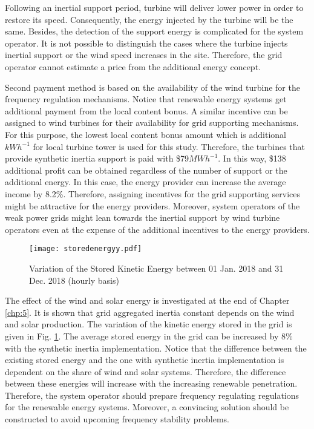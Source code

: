 Following an inertial support period, turbine will deliver lower power in order to restore its speed. Consequently, the energy injected by the turbine will be the same. Besides, the detection of the support energy is complicated for the system operator. It is not possible to distinguish the cases where the turbine injects inertial support or the wind speed increases in the site. Therefore, the grid operator cannot estimate a price from the additional energy concept.\par
\newpage
Second payment method is based on the availability of the wind turbine for the frequency regulation mechanisms. Notice that renewable energy systems get additional payment from the local content bonus. A similar incentive can be assigned to wind turbines for their availability for grid supporting mechanisms. For this purpose, the lowest local content bonus amount which is additional $kWh^{-1}$ for local turbine tower is used for this study. Therefore, the turbines that provide synthetic inertia support is paid with \$79$MWh^{-1}$. In this way, \$138 additional profit can be obtained regardless of the number of support or the additional energy. In this case, the energy provider can increase the average income by 8.2\%. Therefore, assigning incentives for the grid supporting services might be attractive for the energy providers. Moreover, system operators of the weak power grids might lean towards the inertial support by wind turbine operators even at the expense of the additional incentives to the energy providers.\par 
\begin{figure}[h!]
	\centering
	\texttt{[image: storedenergyy.pdf]}
	\caption{Variation of the Stored Kinetic Energy between 01 Jan. 2018 and 31 Dec. 2018 (hourly basis)}
	\label{gridstored}
\end{figure}
\newpage
The effect of the wind and solar energy is investigated at the end of Chapter \ref{chp:5}. It is shown that grid aggregated inertia constant depends on the wind and solar production. The variation of the kinetic energy stored in the grid is given in Fig. \ref{gridstored}. The average stored energy in the grid can be increased by 8\% with the synthetic inertia implementation. Notice that the difference between the existing stored energy and the one with synthetic inertia implementation is dependent on the share of wind and solar systems. Therefore, the difference between these energies will increase with the increasing renewable penetration. Therefore, the system operator should prepare frequency regulating regulations for the renewable energy systems. Moreover, a convincing solution should be constructed to avoid upcoming frequency stability problems. 
\newpage
